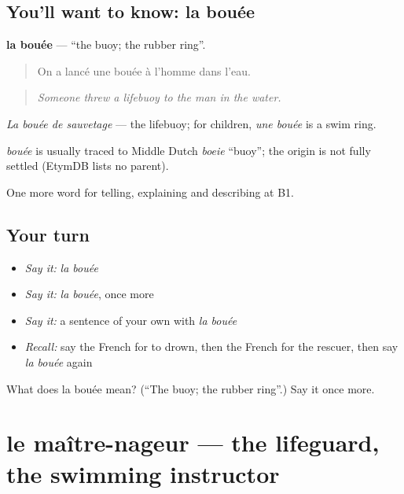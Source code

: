 \subsection*{You'll want to know: la bouée}
\textbf{la bouée} — \textquotedblleft{}the buoy; the rubber ring\textquotedblright{}.

\begin{quote}
On a lancé une bouée à l'homme dans l'eau.
\end{quote}

\begin{quote}
\emph{Someone threw a lifebuoy to the man in the water.}
\end{quote}

\emph{La bouée de sauvetage} — the lifebuoy; for children, \emph{une bouée} is a swim ring.

\begin{cousinweb}
\emph{bouée} is usually traced to Middle Dutch \emph{boeie} \textquotedblleft{}buoy\textquotedblright{}; the origin is not fully settled (EtymDB lists no parent).
\end{cousinweb}

\begin{grammarlens}[title={What you've built}]
One more word for telling, explaining and describing at B1.
\end{grammarlens}

\subsection*{Your turn}
\begin{itemize}
\raggedright
  \item \emph{Say it:} \emph{la bouée}
  \item \emph{Say it:} \emph{la bouée}, once more
  \item \emph{Say it:} a sentence of your own with \emph{la bouée}
  \item \emph{Recall:} say the French for to drown, then the French for the rescuer, then say \emph{la bouée} again
\end{itemize}

\begin{tcolorbox}[breakable,colback=teal!4,colframe=teal!35!black,title={Before you move on}]
What does la bouée mean? (\textquotedblleft{}The buoy; the rubber ring\textquotedblright{}.) Say it once more.
\end{tcolorbox}
\section[le maître-nageur]{le maître-nageur — the lifeguard, the swimming instructor}

